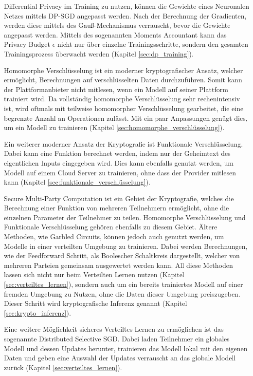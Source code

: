 Differential Privacy im Training zu nutzen, können die Gewichte eines Neuronalen Netzes mittels DP-SGD angepasst werden.
Nach der Berechnung der Gradienten, werden diese mittels des Gauß-Mechanismus verrauscht, bevor die Gewichte angepasst werden.
Mittels des sogenannten Moments Accountant kann das Privacy Budget $\epsilon$ nicht nur über einzelne Trainingsschritte, sondern den gesamten Trainingsprozess überwacht werden (Kapitel \ref{sec:dp_training}).

Homomorphe Verschlüsselung ist ein moderner kryptografischer Ansatz, welcher ermöglicht, Berechnungen auf verschlüsselten Daten durchzuführen.
Somit kann der Plattformanbieter nicht mitlesen, wenn ein Modell auf seiner Plattform trainiert wird.
Da vollständig homomorphe Verschlüsselung sehr rechenintensiv ist, wird oftmals mit teilweise homomorpher Verschlüsselung gearbeitet, die eine begrenzte Anzahl an Operationen zulässt.
Mit ein paar Anpassungen genügt dies, um ein Modell zu trainieren (Kapitel \ref{sec:homomorphe_verschlüsselung}).

Ein weiterer moderner Ansatz der Kryptografie ist Funktionale Verschlüsselung.
Dabei kann eine Funktion berechnet werden, indem nur der Geheimtext des eigentlichen Inputs eingegeben wird.
Dies kann ebenfalls genutzt werden, um Modell auf einem Cloud Server zu trainieren, ohne dass der Provider mitlesen kann (Kapitel \ref{sec:funktionale_verschlüsselung}).

Secure Multi-Party Computation ist ein Gebiet der Kryptografie, welches die Berechnung einer Funktion von mehreren Teilnehmern ermöglicht, ohne die einzelnen Parameter der Teilnehmer zu teilen.
Homomorphe Verschlüsselung und Funktionale Verschlüsselung gehören ebenfalls zu diesem Gebiet.
Ältere Methoden, wie Garbled Circuits, können jedoch auch genutzt werden, um Modelle in einer verteilten Umgebung zu trainieren. 
Dabei werden Berechnungen, wie der Feedforward Schritt, als Boolescher Schaltkreis dargestellt, welcher von mehreren Parteien gemeinsam ausgewertet werden kann.
All diese Methoden lassen sich nicht nur beim Verteilten Lernen nutzen (Kapitel \ref{sec:verteiltes_lernen}), sondern auch um ein bereits trainiertes Modell auf einer fremden Umgebung zu Nutzen, ohne die Daten dieser Umgebung preiszugeben. 
Dieser Schritt wird kryptografische Inferenz genannt (Kapitel \ref{sec:krypto_inferenz}). 

Eine weitere Möglichkeit sicheres Verteiltes Lernen zu ermöglichen ist das sogenannte Distributed Selective SGD. 
Dabei laden Teilnehmer ein globales Modell und dessen Updates herunter, trainieren das Modell lokal mit den eigenen Daten und geben eine Auswahl der Updates verrauscht an das globale Modell zurück (Kapitel \ref{sec:verteiltes_lernen}).

